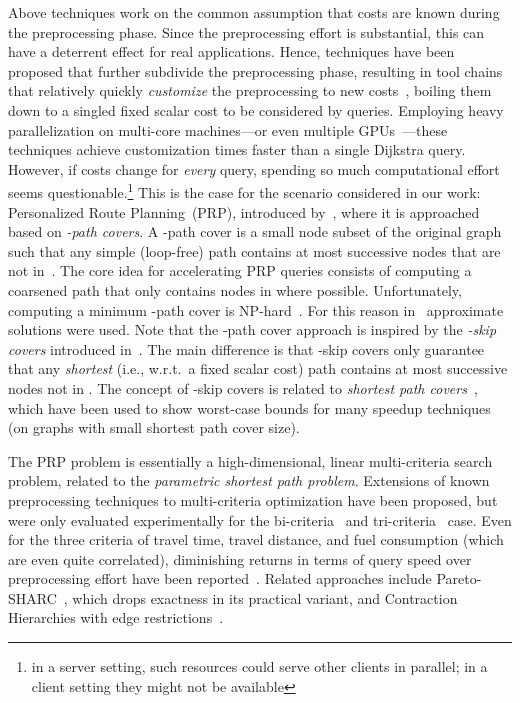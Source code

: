\documentclass{sig-alternate}
\begin{document}
Above techniques work on the common assumption that costs
are known during the preprocessing phase. Since the preprocessing
effort is substantial, this can have a deterrent effect for real applications. 
Hence, techniques have been proposed that further subdivide the preprocessing phase, resulting in tool chains
that relatively quickly \emph{customize} the preprocessing to new costs~\cite{dgpw-crprn-13,dsw-cch-sea-14}, 
boiling them down to a singled fixed scalar cost to be considered by queries. 
Employing heavy parallelization on multi-core machines---or even multiple GPUs~\cite{dkw-cddgp-14}---these techniques achieve customization times faster than a single Dijkstra query. However, if costs change for \emph{every} query, spending so much computational effort seems questionable.\footnote{in a server setting, such resources could serve other clients in parallel; in a client setting they might not be available}
This is the case
for the scenario considered in our work: Personalized Route
Planning~(PRP), introduced by~\cite{fns-opca-14}, where it is approached based on \emph{-path covers}.
A -path cover  is a small node subset of the original graph such that any simple (loop-free) path contains at most  successive nodes that are not in~. 
The core idea for accelerating PRP queries consists of computing a coarsened path that only contains nodes in  where possible. 
Unfortunately, computing a minimum -path cover is NP-hard~\cite{DBLP:journals/dam/BresarKKS11}.
For this reason in~\cite{fns-opca-14} approximate solutions were used.
Note that the -path cover approach is inspired by the \emph{-skip
covers} introduced in~\cite{tsp-osp-11}. The main difference is that
-skip covers only guarantee that any \emph{shortest }(i.e., w.r.t.~a
fixed scalar cost) path contains at most  successive nodes not in
. The concept of -skip covers is related to \emph{shortest path covers}~\cite{adfgw-h-13}, which have been used to show worst-case bounds for many speedup techniques (on graphs with small shortest path cover size).



The PRP problem is essentially a high-dimensional, linear multi-criteria search problem, related to the \emph{parametric shortest path problem}. Extensions of known preprocessing techniques to multi-criteria optimization have been proposed, but were only evaluated experimentally for the bi-criteria~\cite{gks-rpfof-10}
and tri-criteria~\cite{fs-pcchm-13} case. Even for the three criteria
of travel time, travel distance, and fuel consumption (which are even
quite correlated), diminishing returns in terms of query speed over preprocessing effort have been reported~\cite{fs-pcchm-13}.
Related approaches include Pareto-SHARC~\cite{dw-pps-09}, which drops exactness in its practical variant, and
Contraction Hierarchies with edge restrictions~\cite{DBLP:journals/jea/GeisbergerRST12}. 
\end{document}
